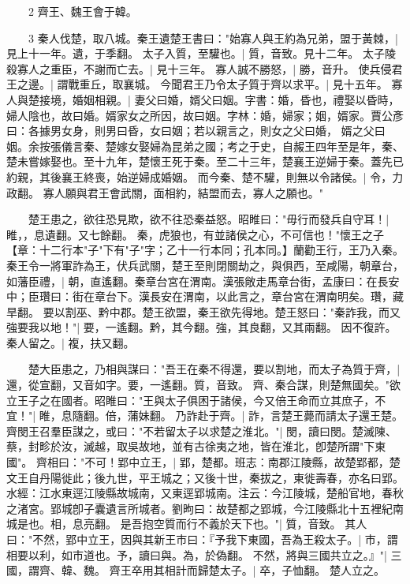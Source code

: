 　　2 齊王、魏王會于韓。

　　3 秦人伐楚，取八城。秦王遺楚王書曰："始寡人與王約為兄弟，盟于黃棘，|{
	見上十一年。遺，于季翻。
	}
太子入質，至驩也。|{
	質，音致。見十二年。
	}
太子陵殺寡人之重臣，不謝而亡去。|{
	見十三年。
	}
寡人誠不勝怒，|{
	勝，音升。
	}
使兵侵君王之邊。|{
	謂戰重丘，取襄城。
	}
今聞君王乃令太子質于齊以求平。|{
	見十五年。
	}
寡人與楚接境，婚姻相親。|{
	妻父曰婚，婿父曰姻。字書：婚，昏也，禮娶以昏時，婦人陰也，故曰婚。婿家女之所因，故曰姻。字林：婚，婦家；姻，婿家。賈公彥曰：各據男女身，則男曰昏，女曰姻；若以親言之，則女之父曰婚， 婿之父曰姻。余按張儀言秦、楚嫁女娶婦為昆弟之國；考之于史，自赧王四年至是年，秦、楚未嘗嫁娶也。至十九年，楚懷王死于秦。至二十三年，楚襄王逆婦于秦。蓋先已約親，其後襄王終喪，始逆婦成婚姻。
	}
而今秦、楚不驩，則無以令諸侯。|{
	令，力政翻。
	}
寡人願與君王會武關，面相約，結盟而去，寡人之願也。"

　　楚王患之，欲往恐見欺，欲不往恐秦益怒。昭睢曰："毋行而發兵自守耳！|{
	睢，，息遺翻。又七餘翻。
	}
秦，虎狼也，有並諸侯之心，不可信也！"懷王之子【章：十二行本"子"下有"子"字；乙十一行本同；孔本同。】蘭勸王行，王乃入秦。秦王令一將軍詐為王，伏兵武關，楚王至則閉關劫之，與俱西，至咸陽，朝章台，如藩臣禮，|{
	朝，直遙翻。秦章台宮在渭南。漢張敞走馬章台街，孟康曰：在長安中；臣瓚曰：街在章台下。漢長安在渭南，以此言之，章台宮在渭南明矣。瓚，藏旱翻。
	}
要以割巫、黔中郡。楚王欲盟，秦王欲先得地。楚王怒曰："秦詐我，而又強要我以地！"|{
	要，一遙翻。黔，其今翻。強，其良翻，又其兩翻。
	}
因不復許。秦人留之。|{
	複，扶又翻。
	}

　　楚大臣患之，乃相與謀曰："吾王在秦不得還，要以割地，而太子為質于齊，|{
	還，從宣翻，又音如字。要，一遙翻。質，音致。
	}
齊、秦合謀，則楚無國矣。"欲立王子之在國者。昭睢曰："王與太子俱困于諸侯，今又倍王命而立其庶子，不宜！"|{
	睢，息隨翻。倍，蒲妹翻。
	}
乃詐赴于齊。|{
	詐，言楚王薨而請太子還王楚。
	}
齊閔王召羣臣謀之，或曰："不若留太子以求楚之淮北。"|{
	閔，讀曰閔。楚滅陳、蔡，封畛於汝，滅越，取吳故地，並有古徐夷之地，皆在淮北，卽楚所謂"下東國"。
	}
齊相曰："不可！郢中立王，|{
	郢，楚都。班志：南郡江陵縣，故楚郢都，楚文王自丹陽徙此；後九世，平王城之；又後十世，秦拔之，東徙壽春，亦名曰郢。水經：江水東逕江陵縣故城南，又東逕郢城南。注云：今江陵城，楚船官地，春秋之渚宮。郢城卽子囊遺言所城者。劉昫曰：故楚都之郢城，今江陵縣北十五裡紀南城是也。相，息亮翻。
	}
是吾抱空質而行不義於天下也。"|{
	質，音致。
	}
其人曰："不然，郢中立王，因與其新王市曰：『予我下東國，吾為王殺太子。|{
	巿，謂相要以利，如巿道也。予，讀曰與。為，於偽翻。
	}
不然，將與三國共立之。』"|{
	三國，謂齊、韓、魏。
	}
齊王卒用其相計而歸楚太子。|{
	卒，子恤翻。
	}
楚人立之。

